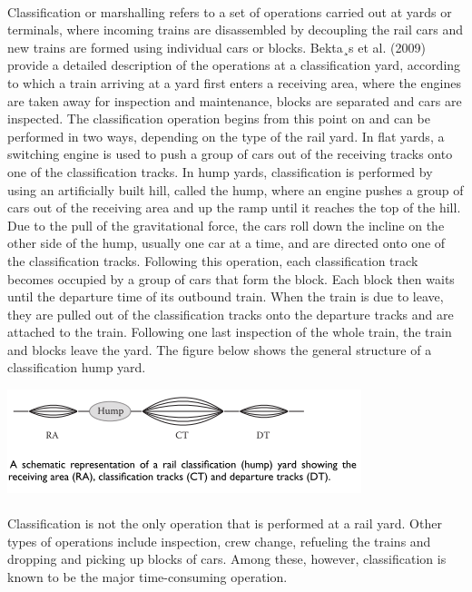 \paragraph{}
Classification or marshalling refers to a set of operations carried out at
yards or terminals, where incoming trains are disassembled by decoupling the rail cars and new trains are formed using individual cars or blocks. Bekta¸s et al. (2009) provide a detailed description of the operations at a classification yard, according to which a train arriving at a yard first enters a receiving area, where the engines are taken away for inspection and maintenance, blocks are separated and cars are inspected. The classification operation begins from this point on and can be performed in two ways, depending on the type of the rail yard. In flat yards, a switching engine is used to push a group of cars out of the receiving tracks onto one of the classification tracks. In hump yards, classification is performed by using an artificially built hill, called the hump, where an engine pushes a group of cars out of the receiving area and up the ramp until it reaches the top of the hill. Due to the pull of the gravitational force, the cars roll down the incline on the other side of the hump, usually one car at a time, and are directed onto one of the classification tracks. Following this operation, each classification track becomes occupied by a group of cars that form the block. Each block then waits until the departure time of its outbound train. When the train is due to leave, they are pulled out of the classification tracks onto the departure tracks and are attached to the train. Following one last inspection of the whole train, the train and blocks leave the yard. The figure below shows the general structure of a classification hump yard.
%
\begin{center}
	\includegraphics[scale=0.7]{gfx/fig33.png}
\end{center}
\paragraph{}
Classification is not the only operation that is performed at a rail yard.
Other types of operations include inspection, crew change, refueling the trains and dropping and picking up blocks of cars. Among these, however, classification is known to be the major time-consuming operation.
%
